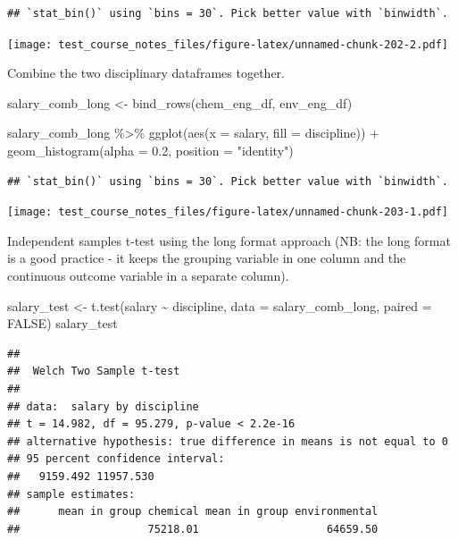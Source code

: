 \documentclass[
]{book}
\newenvironment{Shaded}{\begin{snugshade}}{\end{snugshade}}
\newcommand{\AttributeTok}[1]{\textcolor[rgb]{0.77,0.63,0.00}{#1}}
\newcommand{\ConstantTok}[1]{\textcolor[rgb]{0.00,0.00,0.00}{#1}}
\newcommand{\FloatTok}[1]{\textcolor[rgb]{0.00,0.00,0.81}{#1}}
\newcommand{\FunctionTok}[1]{\textcolor[rgb]{0.00,0.00,0.00}{#1}}
\newcommand{\NormalTok}[1]{#1}
\newcommand{\OtherTok}[1]{\textcolor[rgb]{0.56,0.35,0.01}{#1}}
\newcommand{\SpecialCharTok}[1]{\textcolor[rgb]{0.00,0.00,0.00}{#1}}
\newcommand{\StringTok}[1]{\textcolor[rgb]{0.31,0.60,0.02}{#1}}
\begin{document}
\begin{verbatim}
## `stat_bin()` using `bins = 30`. Pick better value with `binwidth`.
\end{verbatim}

\texttt{[image: test\_course\_notes\_files/figure-latex/unnamed-chunk-202-2.pdf]}

Combine the two disciplinary dataframes together.

\begin{Shaded}
\begin{Highlighting}[]
\NormalTok{salary\_comb\_long }\OtherTok{\textless{}{-}} \FunctionTok{bind\_rows}\NormalTok{(chem\_eng\_df, env\_eng\_df)}



\NormalTok{salary\_comb\_long }\SpecialCharTok{\%\textgreater{}\%} 
  \FunctionTok{ggplot}\NormalTok{(}\FunctionTok{aes}\NormalTok{(}\AttributeTok{x =}\NormalTok{ salary, }\AttributeTok{fill =}\NormalTok{ discipline)) }\SpecialCharTok{+}
  \FunctionTok{geom\_histogram}\NormalTok{(}\AttributeTok{alpha =} \FloatTok{0.2}\NormalTok{, }\AttributeTok{position =} \StringTok{"identity"}\NormalTok{)}
\end{Highlighting}
\end{Shaded}

\begin{verbatim}
## `stat_bin()` using `bins = 30`. Pick better value with `binwidth`.
\end{verbatim}

\texttt{[image: test\_course\_notes\_files/figure-latex/unnamed-chunk-203-1.pdf]}

Independent samples t-test using the long format approach (NB: the long format is a good practice - it keeps the grouping variable in one column and the continuous outcome variable in a separate column).

\begin{Shaded}
\begin{Highlighting}[]
\NormalTok{salary\_test }\OtherTok{\textless{}{-}} \FunctionTok{t.test}\NormalTok{(salary }\SpecialCharTok{\textasciitilde{}}\NormalTok{ discipline, }\AttributeTok{data =}\NormalTok{ salary\_comb\_long, }\AttributeTok{paired =} \ConstantTok{FALSE}\NormalTok{)}
\NormalTok{salary\_test}
\end{Highlighting}
\end{Shaded}

\begin{verbatim}
## 
##  Welch Two Sample t-test
## 
## data:  salary by discipline
## t = 14.982, df = 95.279, p-value < 2.2e-16
## alternative hypothesis: true difference in means is not equal to 0
## 95 percent confidence interval:
##   9159.492 11957.530
## sample estimates:
##      mean in group chemical mean in group environmental 
##                    75218.01                    64659.50
\end{verbatim}
\end{document}

